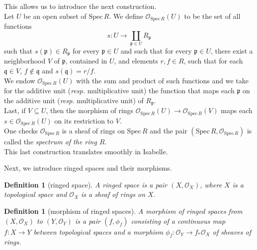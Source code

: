 \documentclass[12pt]{scrartcl}
\newtheorem{definition}[proposition]{Definition}
\def\spec{\text{Spec}\,R}
\begin{document}
This allows us to introduce the next construction.	\\
Let $U$ be an open subset of $\text{Spec}\,R$. We define $\mathscr{O}_{\spec}(U)$ to be the set of all functions 
	\[
	s: U \rightarrow \coprod \limits_{\mathfrak{p} \in U} R_{\mathfrak{p}}
	\]
such that $s(\mathfrak{p}) \in R_{\mathfrak{p}}$ for every $\mathfrak{p} \in U$ and such that for every $\mathfrak{p} \in U$, there exist a neighborhood $V$ of $\mathfrak{p}$, contained in $U$, and elements $r, f \in R$, such that for each $\mathfrak{q} \in V$, $f \notin \mathfrak{q}$ and $s(\mathfrak{q}) = r/f$. \\
We endow $\mathscr{O}_{\spec}(U)$ with the sum and product of such functions and we take for the additive unit (\textit{resp.} multiplicative unit) the function that maps each $\mathfrak{p}$ on the additive unit (\textit{resp.} multiplicative unit) of $R_{\mathfrak{p}}$. \\
Last, if $V \subseteq U$, then the morphism of rings $\mathscr{O}_{\spec}(U) \rightarrow \mathscr{O}_{\spec}(V)$ maps each $s \in \mathscr{O}_{\spec}(U)$ on its restriction to $V$. \\
One checks $\mathscr{O}_{\spec}$ is a sheaf of rings on $\text{Spec}\,R$ and the pair $(\text{Spec}\,R, \mathscr{O}_{\spec})$ is called the \emph{spectrum of the ring $R$}. \\
This last construction translates smoothly in Isabelle. 


Next, we introduce ringed spaces and their morphisms.

\begin{definition}[ringed space]
	A ringed space is a pair $(X, \mathscr{O}_X)$, where $X$ is a topological space and $\mathscr{O}_X$ is a sheaf of rings on $X$.
\end{definition}


\begin{definition}[morphism of ringed spaces]
	A morphism of ringed spaces from $(X, \mathscr{O}_X)$ to $(Y, \mathscr{O}_Y)$ is a pair $(f, \phi_f)$ consisting of a continuous map $f: X \rightarrow Y$ between topological spaces and a morphism $\phi_f: \mathscr{O}_Y \rightarrow f_{*} \mathscr{O}_X$ of sheaves of rings.   
\end{definition}
\end{document}
